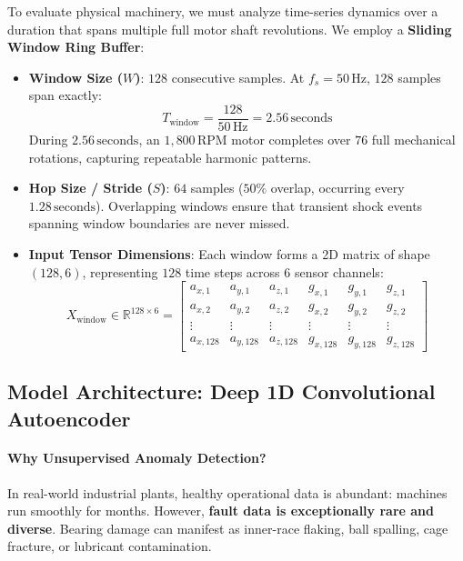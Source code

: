 To evaluate physical machinery, we must analyze time-series dynamics over a duration that spans multiple full motor shaft revolutions. We employ a \textbf{Sliding Window Ring Buffer}:
\begin{itemize}
    \item \textbf{Window Size ($W$)}: $128$ consecutive samples. At $f_s = 50\,\text{Hz}$, $128$ samples span exactly:
    \begin{equation}
    T_{\text{window}} = \frac{128}{50\,\text{Hz}} = 2.56\,\text{seconds}
    \end{equation}
    During $2.56\,\text{seconds}$, an $1{,}800\,\text{RPM}$ motor completes over $76$ full mechanical rotations, capturing repeatable harmonic patterns.
    \item \textbf{Hop Size / Stride ($S$)}: $64$ samples ($50\%$ overlap, occurring every $1.28\,\text{seconds}$). Overlapping windows ensure that transient shock events spanning window boundaries are never missed.
    \item \textbf{Input Tensor Dimensions}: Each window forms a 2D matrix of shape $(128, 6)$, representing $128$ time steps across $6$ sensor channels:
    \begin{equation}
    X_{\text{window}} \in \mathbb{R}^{128 \times 6} = \begin{bmatrix}
    a_{x,1} & a_{y,1} & a_{z,1} & g_{x,1} & g_{y,1} & g_{z,1} \\
    a_{x,2} & a_{y,2} & a_{z,2} & g_{x,2} & g_{y,2} & g_{z,2} \\
    \vdots & \vdots & \vdots & \vdots & \vdots & \vdots \\
    a_{x,128} & a_{y,128} & a_{z,128} & g_{x,128} & g_{y,128} & g_{z,128}
    \end{bmatrix}
    \end{equation}
\end{itemize}

\subsection{Model Architecture: Deep 1D Convolutional Autoencoder}\label{subsec:p3_architecture}

\paragraph{Why Unsupervised Anomaly Detection?}
In real-world industrial plants, healthy operational data is abundant: machines run smoothly for months. However, \textbf{fault data is exceptionally rare and diverse}. Bearing damage can manifest as inner-race flaking, ball spalling, cage fracture, or lubricant contamination. 

